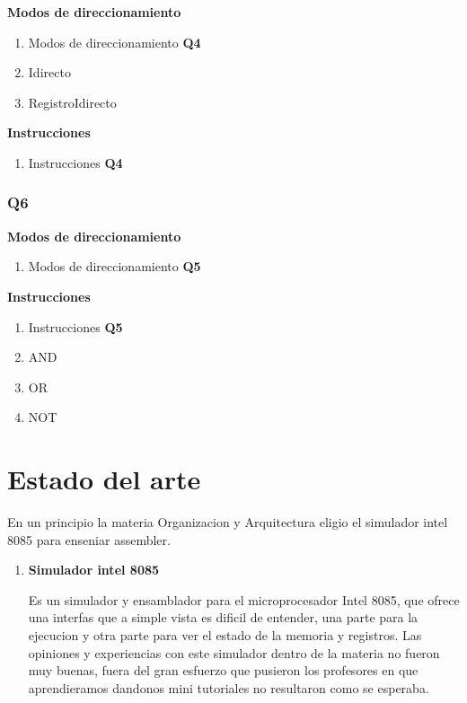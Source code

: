 \textbf{Modos de direccionamiento}
\begin{enumerate}
\item Modos de direccionamiento \textbf{Q4}
\item Idirecto
\item RegistroIdirecto
\end{enumerate}

\textbf{Instrucciones}
\begin{enumerate}
\item Instrucciones \textbf{Q4}
\end{enumerate}

\subsubsection{Q6}

\textbf{Modos de direccionamiento}
\begin{enumerate}
\item Modos de direccionamiento \textbf{Q5}
\end{enumerate}

\textbf{Instrucciones}
\begin{enumerate}
\item Instrucciones \textbf{Q5}
\item AND
\item OR
\item NOT
\end{enumerate}


\section{Estado del arte}

En un principio la materia Organizacion y Arquitectura eligio el simulador intel 8085 para enseniar assembler.

\begin{enumerate}
\item \textbf{Simulador intel 8085}

Es un simulador y ensamblador para el microprocesador Intel 8085, que ofrece una interfas que a simple vista es dificil de entender, una parte para la ejecucion y otra parte para ver el estado de la memoria y registros. 
Las opiniones y experiencias con este simulador dentro de la materia no fueron muy buenas, fuera del gran esfuerzo que pusieron los profesores en que aprendieramos dandonos mini tutoriales no resultaron como se esperaba.
 

\end{enumerate}
